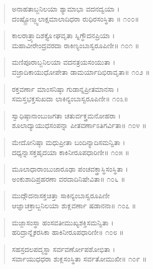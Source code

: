 \begin{verse}
ಅನಾಹತಾಬ್ಜನಿಲಯಾ ಶ್ಯಾಮಾಭಾ ವದನದ್ವಯಾ ।\\ದಂಷ್ಟ್ರೋಜ್ಜ್ವಲಾಕ್ಷಮಾಲಾದಿಧರಾ ರುಧಿರಸಂಸ್ಥಿತಾ  \num{॥ ೧೦೦॥}
\end{verse}

\begin{verse}
ಕಾಲರಾತ್ರ್ಯಾದಿಶಕ್ತ್ಯೋಘವೃತಾ ಸ್ನಿಗ್ಧೌದನಪ್ರಿಯಾ ।\\ಮಹಾವೀರೇಂದ್ರವರದಾ ರಾಕಿಣ್ಯಂಬಾಸ್ವರೂಪಿಣೀ\num{॥ ೧೦೧ ॥}
\end{verse}

\begin{verse}
ಮಣಿಪೂರಾಬ್ಜನಿಲಯಾ ವದನತ್ರಯಸಂಯುತಾ ।\\ವಜ್ರಾದಿಕಾಯುಧೋಪೇತಾ ಡಾಮರ್ಯಾದಿಭಿರಾವೃತಾ\num{॥ ೧೦೨ ॥}
\end{verse}

\begin{verse}
ರಕ್ತವರ್ಣಾ ಮಾಂಸನಿಷ್ಠಾ  ಗುಡಾನ್ನಪ್ರೀತಮಾನಸಾ ।\\ಸಮಸ್ತಭಕ್ತಸುಖದಾ ಲಾಕಿನ್ಯಂಬಾಸ್ವರೂಪಿಣೀ\num{॥ ೧೦೩॥}
\end{verse}

\begin{verse}
ಸ್ವಾಧಿಷ್ಠಾನಾಂಬುಜಗತಾ ಚತುರ್ವಕ್ತ್ರಮನೋಹರಾ ।\\ಶೂಲಾದ್ಯಾಯುಧಸಂಪನ್ನಾ ಪೀತವರ್ಣಾಽತಿಗರ್ವಿತಾ\num{॥ ೧೦೪ ॥}
\end{verse}

\begin{verse}
ಮೇದೋನಿಷ್ಠಾ ಮಧುಪ್ರೀತಾ  ಬಂದಿನ್ಯಾದಿಸಮನ್ವಿತಾ ।\\ದಧ್ಯನ್ನಾಸಕ್ತಹೃದಯಾ ಕಾಕಿನೀರೂಪಧಾರಿಣೀ\num{॥ ೧೦೫ ॥}
\end{verse}

\begin{verse}
ಮೂಲಾಧಾರಾಂಬುಜಾರೂಢಾ ಪಂಚವಕ್ತ್ರಾಸ್ಥಿಸಂಸ್ಥಿತಾ ।\\ಅಂಕುಶಾದಿಪ್ರಹರಣಾ ವರದಾದಿನಿಷೇವಿತಾ\num{॥ ೧೦೬ ॥}
\end{verse}

\begin{verse}
ಮುದ್ಗೌದನಾಸಕ್ತಚಿತ್ತಾ ಸಾಕಿನ್ಯಂಬಾಸ್ವರೂಪಿಣೀ \\ಆಜ್ಞಾಚಕ್ರಾಬ್ಜನಿಲಯಾ ಶುಕ್ಲವರ್ಣಾ ಷಡಾನನಾ\num{॥ ೧೦೭ ॥}
\end{verse}

\begin{verse}
ಮಜ್ಜಾಸಂಸ್ಥಾ ಹಂಸವತೀಮುಖ್ಯಶಕ್ತಿಸಮನ್ವಿತಾ ।\\ಹರಿದ್ರಾನ್ನೈಕರಸಿಕಾ ಹಾಕಿನೀರೂಪಧಾರಿಣೀ\num{॥ ೧೦೮ ॥}
\end{verse}

\begin{verse}
ಸಹಸ್ರದಲಪದ್ಮಸ್ಥಾ ಸರ್ವವರ್ಣೋಪಶೋಭಿತಾ ।\\ಸರ್ವಾಯುಧಧರಾ  ಶುಕ್ಲಸಂಸ್ಥಿತಾ ಸರ್ವತೋಮುಖೀ\num{॥ ೧೦೯ ॥}
\end{verse}

